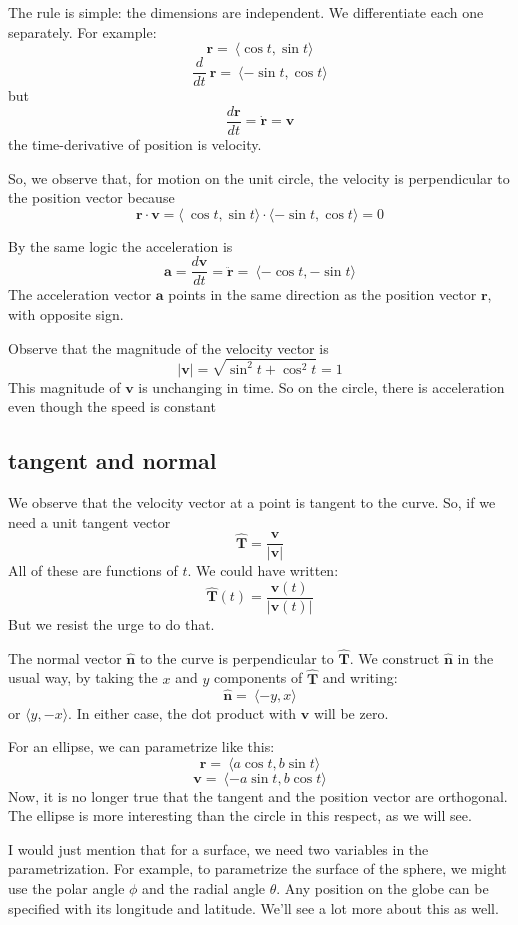 \documentclass[11pt, oneside]{article}
\begin{document}
The rule is simple:  the dimensions are independent.  We differentiate each one separately.  For example:
\[ \mathbf{r} =  \ \langle \cos t, \sin t \rangle \]
\[ \frac{d}{dt} \ \mathbf{r} =  \ \langle - \sin t, \cos t \rangle \]
but
\[ \frac{d \mathbf{r}}{dt} = \mathbf{\dot{r}} = \mathbf{v} \]
the time-derivative of position is velocity.

So, we observe that, for motion on the unit circle, the velocity is perpendicular to the position vector because
\[ \mathbf{r} \cdot \mathbf{v} =  \langle \ \cos t, \sin t \rangle \cdot \langle -\sin t, \cos t \rangle = 0 \]

By the same logic the acceleration is
\[ \mathbf{a} = \frac{d \mathbf{v}}{dt} = \mathbf{\ddot{r}} = \ \langle -\cos t, -\sin t \rangle  \]
The acceleration vector $\mathbf{a}$ points in the same direction as the position vector $\mathbf{r}$, with opposite sign.

Observe that the magnitude of the velocity vector is
\[ |\mathbf{v}| = \sqrt{\sin^2 t + \cos^2 t} = 1 \]
This magnitude of $\mathbf{v}$ is unchanging in time.  So on the circle, there is acceleration even though the speed is constant

\subsection*{tangent and normal}

We observe that the velocity vector at a point  is tangent to the curve.  So, if we need a unit tangent vector
\[ \mathbf{\hat{T}} = \frac{\mathbf{v}}{|\mathbf{v}|} \]
All of these are functions of $t$.  We could have written:
\[ \mathbf{\hat{T}}(t) = \frac{\mathbf{v}(t)}{|\mathbf{v}(t) |} \]
But we resist the urge to do that.

The normal vector $\mathbf{\hat{n}}$ to the curve is perpendicular to $\mathbf{\hat{T}}$.  We construct $\mathbf{\hat{n}}$ in the usual way, by taking the $x$ and $y$ components of $\mathbf{\hat{T}}$ and writing:
\[ \mathbf{\hat{n}} = \ \langle - y, x \rangle \]
or $\langle y, -x \rangle$.  In either case, the dot product with $\mathbf{v}$ will be zero.

For an ellipse, we can parametrize like this:
\[ \mathbf{r} = \ \langle a \cos t, b \sin t \rangle \]
\[ \mathbf{v} = \ \langle -a \sin t, b \cos t \rangle \]
Now, it is no longer true that the tangent and the position vector are orthogonal.  The ellipse is more interesting than the circle in this respect, as we will see.

I would just mention that for a surface, we need two variables in the parametrization.  For example, to parametrize the surface of the sphere, we might use the polar angle $\phi$ and the radial angle $\theta$.  Any position on the globe can be specified with its longitude and latitude.  We'll see a lot more about this as well.
\end{document}

